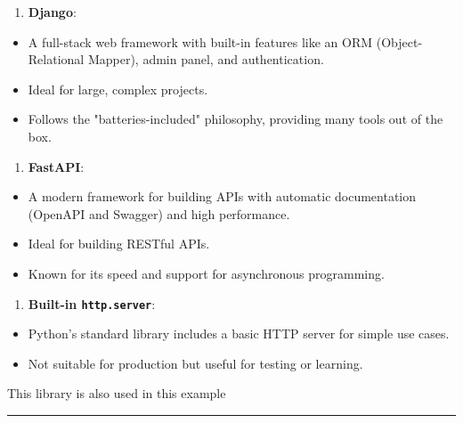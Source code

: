 \documentclass[11pt]{article}
\providecommand{\tightlist}{%
      \setlength{\itemsep}{0pt}\setlength{\parskip}{0pt}}
\begin{document}
\begin{enumerate}
\def\labelenumi{\arabic{enumi}.}
\setcounter{enumi}{1}
\tightlist
\item
  \textbf{Django}:
\end{enumerate}

\begin{itemize}
\tightlist
\item
  A full-stack web framework with built-in features like an ORM
  (Object-Relational Mapper), admin panel, and authentication.
\item
  Ideal for large, complex projects.
\item
  Follows the "batteries-included" philosophy, providing many tools out
  of the box.
\end{itemize}

\begin{enumerate}
\def\labelenumi{\arabic{enumi}.}
\setcounter{enumi}{2}
\tightlist
\item
  \textbf{FastAPI}:
\end{enumerate}

\begin{itemize}
\tightlist
\item
  A modern framework for building APIs with automatic documentation
  (OpenAPI and Swagger) and high performance.
\item
  Ideal for building RESTful APIs.
\item
  Known for its speed and support for asynchronous programming.
\end{itemize}

\begin{enumerate}
\def\labelenumi{\arabic{enumi}.}
\setcounter{enumi}{3}
\tightlist
\item
  \textbf{Built-in \texttt{http.server}}:
\end{enumerate}

\begin{itemize}
\tightlist
\item
  Python's standard library includes a basic HTTP server for simple use
  cases.
\item
  Not suitable for production but useful for testing or learning.
\end{itemize}

This library is also used in this example

\begin{center}\rule{0.5\linewidth}{\linethickness}\end{center}
\end{document}
